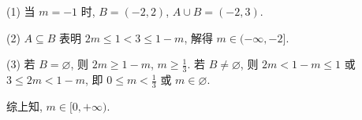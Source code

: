 \beginsolution
  (1) 当 $m=-1$ 时, $B=(-2,2)$, $A\cup B= (-2,3)$.
  
  (2) $A\subseteq B$ 表明 $2m\leqslant 1<3\leqslant 1-m$, 解得 $m\in(-\infty,-2]$.
  
  (3) 若 $B=\varnothing$, 则 $2m\geqslant 1-m$, $m\geqslant \frac13$.
  若 $B\neq\varnothing$, 则 $2m< 1-m\leqslant 1$ 或 $3\leqslant 2m< 1-m$, 即 $0\leqslant m< \frac13$ 或 $m\in\varnothing$.
  
  综上知, $m\in[0,+\infty)$. 
\endsolution

